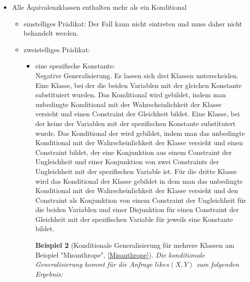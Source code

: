 \documentclass[a4paper, 11pt]{book}
\newtheorem{Bsp}{Beispiel}[section]
\begin{document}
\begin{itemize}
\begin{itemize}
\begin{Bsp}[Konditionale Generalisierung am Beispiel "{}Birds3Classes"{}]
		\noindent
		Klasse 1: $ \{flies(Sylvester)[0.664], flies(Kirby)[0.664]\}  $\\
		Klasse 2: $ \{flies(Tweety)[0]\} $\\
		Klasse 3: $ \{flies(Bully)[0.3]\} $\\
		\\
		Das Konditional für Klasse 1: $ flies(X)[0.664]<(X = Sylvester \lor  X = Kirby)>$\\
		Die Konditional für Klasse 2: $ flies(Tweety)[0] $\\
		Das Konditional für Klasse 3: $ flies(Bully)[0.3] $
		\end{Bsp}
		\item zweistelliges Prädikat:\\ 
		Dieser Fall ist nicht zu betrachten, da die Klassen bei zweistelligen Prädikaten jeweils mindestens zwei Elemente enthalten.
			\end{itemize}
	\item Alle Äquivalenzklassen enthalten mehr als ein Konditional
	\begin{itemize}
		\item einstelliges Prädikat: Der Fall kann nicht eintreten und muss daher nicht behandelt werden.  \\
		\item zweistelliges Prädikat:\\
		\begin{itemize}
			\item eine spezifische Konstante:\\
		Negative Generalisierung. Es lassen sich drei Klassen unterscheiden. Eine Klasse, bei der die beiden Variablen mit der gleichen Konstante substituiert wurden. Das Konditional wird gebildet, indem man unbedingte Konditional mit der Wahrscheinlichkeit der Klasse versieht und einen Constraint der Gleichheit bildet. Eine Klasse, bei der keine der Variablen mit der spezifischen Konstante substituiert wurde. Das Konditional der wird gebildet, indem man das unbedingte Konditional mit der Wahrscheinlichkeit der Klasse versieht und einen Constraint bildet, der eine Konjunktion aus einem Constraint der Ungleichheit und einer Konjunktion von zwei Constraints der Ungleichheit mit der spezifischen Variable ist. Für die dritte Klasse wird das Konditional der Klasse gebildet in dem man das unbedingte Konditional mit der Wahrscheinlichkeit der Klasse versieht und den Constraint als Konjunktion von einem Constraint der Ungleichheit für die beiden Variablen und einer Disjunktion für einen Constraint der Gleichheit mit der spezifischen Variable für jeweils eine Konstante bildet.\\
			\begin{Bsp}[Konditionale Generalisierung für mehrere Klassen am Beispiel "{}Misanthrope"{}, \ref{Misanthrope}] Die konditionale Generalisierung kommt für die Anfrage $ likes(X,Y) $ zum folgenden Ergebnis:\\
				

\end{Bsp}
\end{itemize}
\end{itemize}
\end{itemize}
\end{document}
